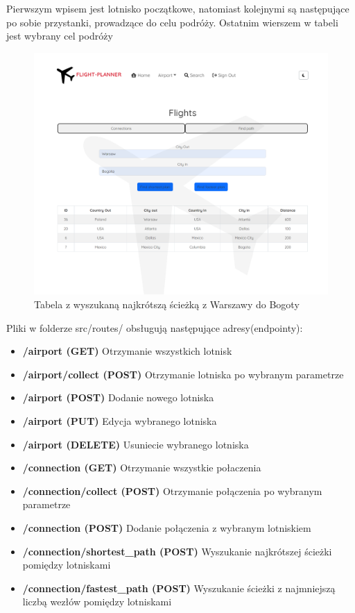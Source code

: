 \documentclass[12pt]{article}
\begin{document}
Pierwszym wpisem jest lotnisko początkowe, natomiast kolejnymi są następujące po sobie przystanki, prowadzące do celu podróży.
Ostatnim wierszem w tabeli jest wybrany cel podróży
\begin{figure}[!ht]
    \centering
    \includegraphics[width=0.55\linewidth]{8}  
    \caption{Tabela z wyszukaną najkrótszą ścieżką z Warszawy do Bogoty}
\end{figure}
\newpage
Pliki w folderze src/routes/ obsługują następujące adresy(endpointy):
\begin{itemize}
    \item \textbf{/airport (GET)} Otrzymanie wszystkich lotnisk
    \item \textbf{/airport/collect (POST)} Otrzymanie lotniska po wybranym parametrze
    \item \textbf{/airport (POST)} Dodanie nowego lotniska
    \item \textbf{/airport (PUT)} Edycja wybranego lotniska
    \item \textbf{/airport (DELETE)} Usuniecie wybranego lotniska
    \item \textbf{/connection (GET)} Otrzymanie wszystkie połaczenia
    \item \textbf{/connection/collect (POST)} Otrzymanie połączenia po wybranym parametrze
    \item \textbf{/connection (POST)} Dodanie połączenia z wybranym lotniskiem
    \item \textbf{/connection/shortest\_path (POST)} Wyszukanie najkrótszej ścieżki pomiędzy lotniskami
    \item \textbf{/connection/fastest\_path (POST)} Wyszukanie ścieżki z najmniejszą liczbą wezłów pomiędzy lotniskami
\end{itemize}
\end{document}
